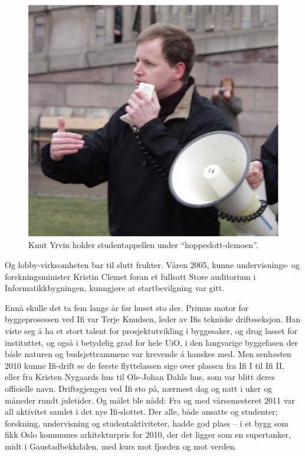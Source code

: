 \documentclass[../../main.tex]{subfiles}
\begin{document}
\begin{figure}
	\includegraphics[width=\linewidth]{images/knut-yrvin-demonstrasjon.png}
	\caption{Knut Yrvin holder studentappellen under ``hoppeslott-demoen''.}
\end{figure}

Og lobby-virksomheten bar til slutt frukter. Våren 2005, kunne undervisnings- og forskningsminister Kristin Clemet foran et fullsatt Store auditorium i Informatikkbygningen, kunngjøre at startbevilgning var gitt.

Ennå skulle det ta fem lange år før huset sto der. Primus motor for byggeprosessen ved Ifi var Terje Knudsen, leder av Ifis tekniske driftsseksjon. Han viste seg å ha et stort talent for prosjektutvikling i byggesaker, og drog lasset for instituttet, og også i betydelig grad for hele UiO, i den langvarige
byggefasen der både naturen og budsjettrammene var krevende å hanskes med. Men senhøsten 2010 kunne Ifi-drift se de første flyttelassen sige over plassen fra Ifi I til Ifi II, eller fra Kristen Nygaards hus til Ole-Johan Dahls hus, som var blitt deres offisielle navn. Driftsgjengen ved Ifi sto på,
nærmest dag og natt i uker og måneder rundt juletider. Og målet ble nådd: Fra og med vårsemesteret 2011 var all aktivitet samlet i det nye Ifi-slottet. Der alle, både ansatte og studenter; forskning, undervisning og studentaktiviteter, hadde god plass – i et bygg som fikk Oslo kommunes arkitekturpris for 2010, der det ligger som en supertanker, midt i Gaustadbekkdalen, med kurs mot fjorden og mot verden.
\end{document}
